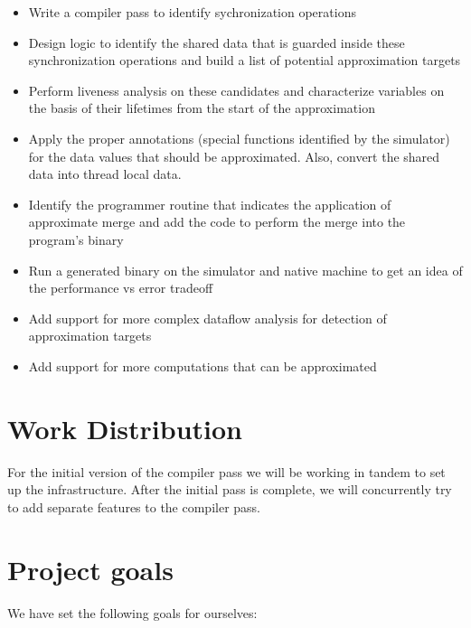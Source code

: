 \documentclass[12pt,conference]{IEEEtran}
\begin{document}
\begin{itemize}

\item Write a compiler pass to identify sychronization operations
\item Design logic to identify the shared data that is guarded inside
these synchronization operations and build a list of potential approximation
targets
\item Perform liveness analysis on these candidates and characterize 
variables on the basis of their lifetimes from the start of the approximation
\item Apply the proper annotations (special functions identified by the simulator)
for the data values that should be approximated. Also, convert the shared data
into thread local data.
\item Identify the programmer routine that indicates the application of 
approximate merge and add the code to perform the merge into the program's binary
\item Run a generated binary on the simulator and native machine to get 
an idea of the performance vs error tradeoff
\item Add support for more complex dataflow analysis for detection 
of approximation targets
\item Add support for more computations that can be approximated

\end{itemize}

\section{Work Distribution}

For the initial version of the compiler pass we will be working in tandem to 
set up the infrastructure. After the initial pass is complete, we will
concurrently try to add separate features to the compiler pass.

\section{Project goals}

We have set the following goals for ourselves:
\end{document}
